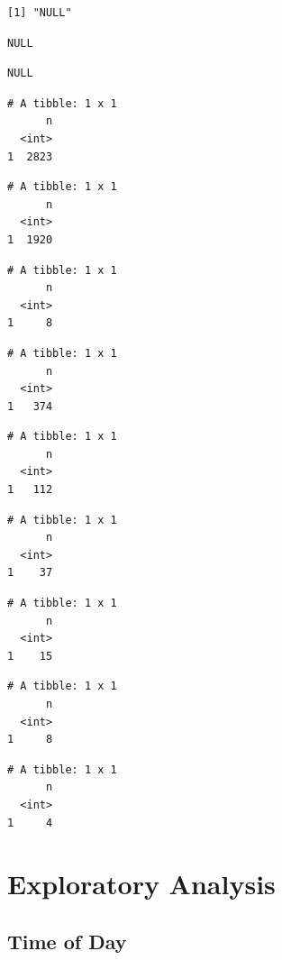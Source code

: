 \documentclass[
  letterpaper,
  DIV=11,
  numbers=noendperiod]{scrartcl}
\begin{document}
\begin{verbatim}
[1] "NULL"
\end{verbatim}

\begin{verbatim}
NULL
\end{verbatim}

\begin{verbatim}
NULL
\end{verbatim}

\begin{verbatim}
# A tibble: 1 x 1
      n
  <int>
1  2823
\end{verbatim}

\begin{verbatim}
# A tibble: 1 x 1
      n
  <int>
1  1920
\end{verbatim}

\begin{verbatim}
# A tibble: 1 x 1
      n
  <int>
1     8
\end{verbatim}

\begin{verbatim}
# A tibble: 1 x 1
      n
  <int>
1   374
\end{verbatim}

\begin{verbatim}
# A tibble: 1 x 1
      n
  <int>
1   112
\end{verbatim}

\begin{verbatim}
# A tibble: 1 x 1
      n
  <int>
1    37
\end{verbatim}

\begin{verbatim}
# A tibble: 1 x 1
      n
  <int>
1    15
\end{verbatim}

\begin{verbatim}
# A tibble: 1 x 1
      n
  <int>
1     8
\end{verbatim}

\begin{verbatim}
# A tibble: 1 x 1
      n
  <int>
1     4
\end{verbatim}

\hypertarget{exploratory-analysis}{%
\section{Exploratory Analysis}\label{exploratory-analysis}}

\hypertarget{time-of-day}{%
\subsection{Time of Day}\label{time-of-day}}
\end{document}
